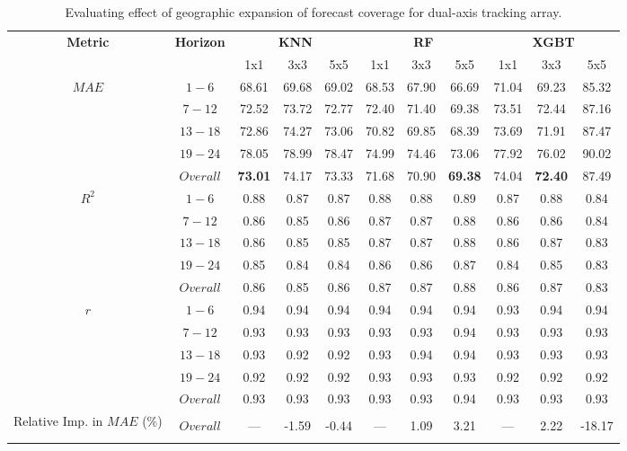 \begin{table}[h]
\begin{center}
    \caption{Evaluating effect of geographic expansion of forecast coverage for dual-axis tracking array.}
    \begin{tabular}{c c c c c c c c c c c}
        \toprule
        \multirow{2}{*}{\textbf{Metric}} & \multirow{2}{*}{\textbf{Horizon}} & \multicolumn{3}{c}{\textbf{KNN}} & \multicolumn{3}{c}{\textbf{RF}} & \multicolumn{3}{c}{\textbf{XGBT}}\\
        \cmidrule{3-11}
         &  & 1x1 & 3x3 & 5x5 & 1x1 & 3x3 & 5x5 & 1x1 & 3x3 & 5x5 \\
        \midrule
        \multirow{5}{*}{$MAE$} & $1 - 6$ & 68.61 & 69.68 & 69.02 & 68.53 & 67.90 & 66.69 & 71.04 & 69.23 & 85.32 \\
        & $7 - 12$ & 72.52 & 73.72 & 72.77 & 72.40 & 71.40 & 69.38 & 73.51 & 72.44 & 87.16 \\
        & $13 - 18$ & 72.86 & 74.27 & 73.06 & 70.82 & 69.85 & 68.39 & 73.69 & 71.91 & 87.47 \\
        & $19 - 24$ & 78.05 & 78.99 & 78.47 & 74.99 & 74.46 & 73.06 & 77.92 & 76.02 & 90.02 \\
        & $Overall$ & \textbf{73.01} & 74.17 & 73.33 & 71.68 & 70.90 & \textbf{69.38} & 74.04 & \textbf{72.40} & 87.49 \\
        \midrule
        \multirow{5}{*}{$R^2$} & $1 - 6$ & 0.88 & 0.87 & 0.87 & 0.88 & 0.88 & 0.89 & 0.87 & 0.88 & 0.84 \\
        & $7 - 12$ & 0.86 & 0.85 & 0.86 & 0.87 & 0.87 & 0.88 & 0.86 & 0.86 & 0.84 \\
        & $13 - 18$ & 0.86 & 0.85 & 0.85 & 0.87 & 0.87 & 0.88 & 0.86 & 0.87 & 0.83 \\
        & $19 - 24$ & 0.85 & 0.84 & 0.84 & 0.86 & 0.86 & 0.87 & 0.84 & 0.85 & 0.83 \\
        & $Overall$ & 0.86 & 0.85 & 0.86 & 0.87 & 0.87 & 0.88 & 0.86 & 0.87 & 0.83 \\
        \midrule
        \multirow{5}{*}{$r$} & $1 - 6$ & 0.94 & 0.94 & 0.94 & 0.94 & 0.94 & 0.94 & 0.93 & 0.94 & 0.94 \\
        & $7 - 12$ & 0.93 & 0.93 & 0.93 & 0.93 & 0.93 & 0.94 & 0.93 & 0.93 & 0.93 \\
        & $13 - 18$ & 0.93 & 0.92 & 0.92 & 0.93 & 0.94 & 0.94 & 0.93 & 0.93 & 0.93 \\
        & $19 - 24$ & 0.92 & 0.92 & 0.92 & 0.93 & 0.93 & 0.93 & 0.92 & 0.92 & 0.92 \\
        & $Overall$ & 0.93 & 0.93 & 0.93 & 0.93 & 0.93 & 0.94 & 0.93 & 0.93 & 0.93 \\
        \bottomrule
        \multirow{3}{5em}{Relative Imp. in $MAE$ (\%)} & & & & & & & & & & \\ 
        & $Overall$ & --- & -1.59 & -0.44 & --- & 1.09 & 3.21 & --- & 2.22 & -18.17 \\
        & & & & & & & & & & \\
        \bottomrule
    \end{tabular}
\end{center}
\end{table}

